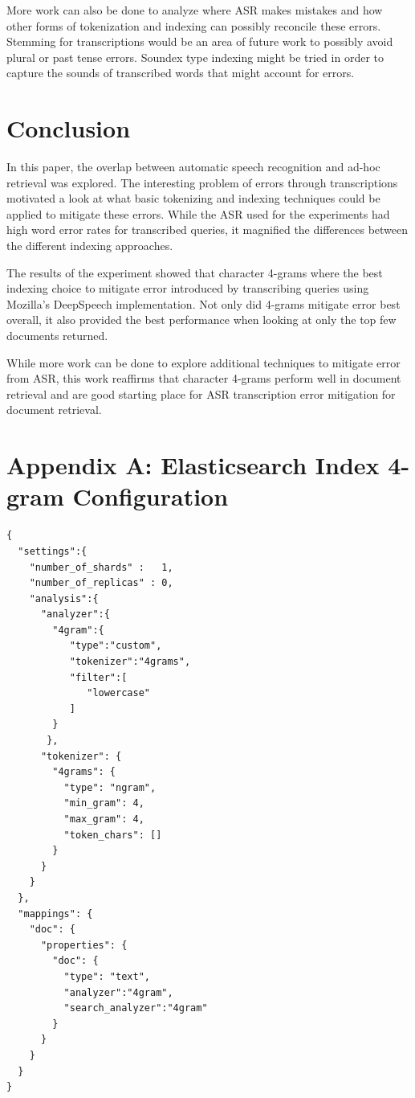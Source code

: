 \documentclass[jair, twoside,11pt,theapa]{article}
\begin{document}
More work can also be done to analyze where ASR makes mistakes and how other forms of tokenization and indexing can possibly reconcile these errors. Stemming for transcriptions would be an area of future work to possibly avoid plural or past tense errors. Soundex type indexing might be tried in order to capture the sounds of transcribed words that might account for errors. 

\section{Conclusion}
\label{Conclusion}
In this paper, the overlap between automatic speech recognition and ad-hoc retrieval was explored. The interesting problem of errors through transcriptions motivated a look at what basic tokenizing and indexing techniques could be applied to mitigate these errors. While the ASR used for the experiments had high word error rates for transcribed queries, it magnified the differences between the different indexing approaches. 

The results of the experiment showed that character 4-grams where the best indexing choice to mitigate error introduced by transcribing queries using Mozilla's DeepSpeech implementation. Not only did 4-grams mitigate error best overall, it also provided the best performance when looking at only the top few documents returned. 

While more work can be done to explore additional techniques to mitigate error from ASR, this work reaffirms that character 4-grams perform well in document retrieval and are good starting place for ASR transcription error mitigation for document retrieval. 



\vskip 0.2in



\raggedbottom
\pagebreak 

\section*{Appendix A: Elasticsearch Index 4-gram Configuration}
\begin{verbatim}
{
  "settings":{
    "number_of_shards" :   1,
    "number_of_replicas" : 0,
    "analysis":{
      "analyzer":{
        "4gram":{ 
           "type":"custom",
           "tokenizer":"4grams",
           "filter":[
              "lowercase"
           ]
        }
       },
      "tokenizer": {
        "4grams": {
          "type": "ngram",
          "min_gram": 4,
          "max_gram": 4,
          "token_chars": []
        }
      }
    }
  },
  "mappings": {
    "doc": {
      "properties": {
        "doc": { 
          "type": "text",
          "analyzer":"4gram",
          "search_analyzer":"4gram"
        }
      }
    }
  }
}
\end{verbatim}
\end{document}
